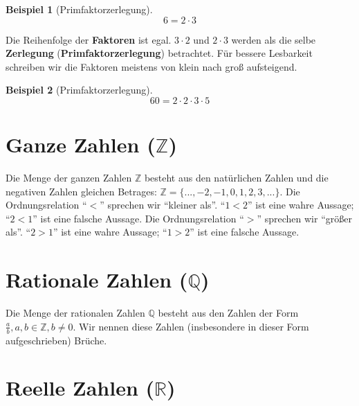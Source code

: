 \documentclass[a4paper]{book}%
\theoremstyle{definition}
\newtheorem{beispiel}{Beispiel}
\begin{document}
\begin{beispiel}[Primfaktorzerlegung]
    \begin{equation}\label{eqn:primfaktorzerlegung01}
        6 = 2 \cdot 3
    \end{equation}
\end{beispiel}

Die Reihenfolge der \textbf{Faktoren} ist egal. $3 \cdot 2$ und $2 \cdot 3$ werden als die selbe \textbf{Zerlegung} (\textbf{Primfaktorzerlegung}) betrachtet. Für bessere Lesbarkeit schreiben wir die Faktoren meistens von klein nach groß aufsteigend.

\begin{beispiel}[Primfaktorzerlegung]
    \begin{equation}\label{eqn:primfaktorzerlegung02}
        60 = 2 \cdot 2 \cdot 3 \cdot 5
    \end{equation}
\end{beispiel}


\section{Ganze Zahlen ($\mathbb{Z}$)}

Die Menge der ganzen Zahlen $\mathbb{Z}$ besteht aus den natürlichen Zahlen und die negativen Zahlen gleichen Betrages: $\mathbb{Z}=\{..., -2, -1, 0, 1, 2, 3, ...\}$. Die Ordnungsrelation \enquote{$<$}\index{$<$} sprechen wir \enquote{kleiner als}. \enquote{$1<2$} ist eine wahre Aussage; \enquote{$2<1$} ist eine falsche Aussage. Die Ordnungsrelation \enquote{$>$}\index{$>$} sprechen wir \enquote{größer als}. \enquote{$2>1$} ist eine wahre Aussage; \enquote{$1>2$} ist eine falsche Aussage.


\section{Rationale Zahlen ($\mathbb{Q}$)}

Die Menge der rationalen Zahlen $\mathbb{Q}$ besteht aus den Zahlen der Form $\frac{a}{b}, a, b \in \mathbb{Z}, b \neq 0$. Wir nennen diese Zahlen (insbesondere in dieser Form aufgeschrieben) Brüche.


\section{Reelle Zahlen ($\mathbb{R}$)}
\end{document}
